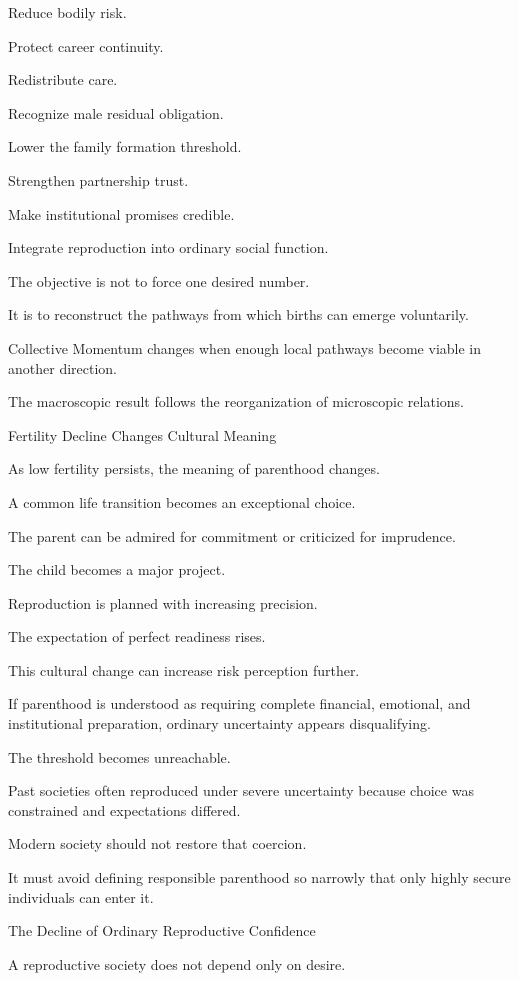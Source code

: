 Reduce bodily risk.

Protect career continuity.

Redistribute care.

Recognize male residual obligation.

Lower the family formation threshold.

Strengthen partnership trust.

Make institutional promises credible.

Integrate reproduction into ordinary social function.

The objective is not to force one desired number.

It is to reconstruct the pathways from which births can emerge voluntarily.

Collective Momentum changes when enough local pathways become viable in another direction.

The macroscopic result follows the reorganization of microscopic relations.

Fertility Decline Changes Cultural Meaning

As low fertility persists, the meaning of parenthood changes.

A common life transition becomes an exceptional choice.

The parent can be admired for commitment or criticized for imprudence.

The child becomes a major project.

Reproduction is planned with increasing precision.

The expectation of perfect readiness rises.

This cultural change can increase risk perception further.

If parenthood is understood as requiring complete financial, emotional, and institutional preparation, ordinary uncertainty appears disqualifying.

The threshold becomes unreachable.

Past societies often reproduced under severe uncertainty because choice was constrained and expectations differed.

Modern society should not restore that coercion.

It must avoid defining responsible parenthood so narrowly that only highly secure individuals can enter it.

The Decline of Ordinary Reproductive Confidence

A reproductive society does not depend only on desire.

